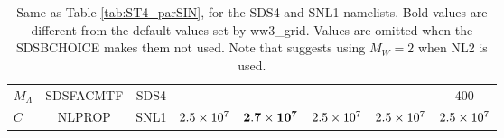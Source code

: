 \begin{landscape}
\begin{table}
\begin{center}
\begin{tabular}{|l|c|c|c|c|c|c|c|}
  $ M_\Lambda$			   & SDSFACMTF	   & SDS4      &            &                   &              &             & 400 \\
  $C$                              & NLPROP        & SNL1      & $2.5\times 10^7$   &$\mathbf{2.7\times 10^7}$& $2.5\times 10^7$    & $2.5\times 10^7$   & $2.5\times 10^7$ \\
 \hline \hline
\end{tabular}  
\end{center}

\caption{Same as Table \ref{tab:ST4_parSIN}, for the {\F SDS4} and {\F SNL1}
namelists. Bold values are different from the default values set by 
 ww3\_grid. Values are omitted when the SDSBCHOICE makes them not used. Note that \cite{Romero2019} suggests using  $ M_W=2$ when NL2 is used.	 } \label{tab:ST4_parSDS}
\end{table}
\end{landscape}
